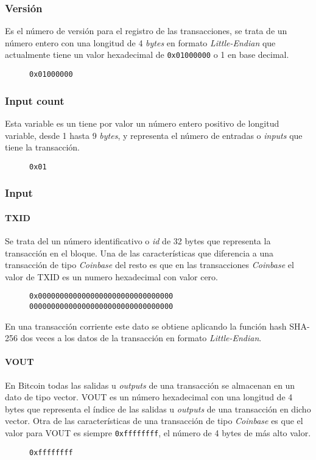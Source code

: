 \documentclass{article}
\begin{document}
    \subsubsection{Versión}
    Es el número de versión para el registro de las transacciones, se trata de un número entero con una longitud de 4 \textit{bytes} en formato \textit{Little-Endian} que actualmente tiene un valor hexadecimal de \texttt{0x01000000} o 1 en base decimal.
    \begin{figure}[H]
        \texttt{0x01000000}
    \end{figure}
    
    \subsubsection{Input count}
    Esta variable es un tiene por valor un número entero positivo de longitud variable, desde 1 hasta 9 \textit{bytes}, y representa el número de entradas o \textit{inputs} que tiene la transacción.
    \begin{figure}[H]
        \texttt{0x01}
    \end{figure}
    
    \subsubsection{Input}
    
    \paragraph{TXID}
    Se trata del un número identificativo o \textit{id} de 32 bytes que representa la transacción en el bloque. Una de las características que diferencia a una transacción de tipo \textit{Coinbase} del resto es que en las transacciones \textit{Coinbase} el valor de TXID es un numero hexadecimal con valor cero.
    \begin{figure}[H]
        \texttt{0x0000000000000000000000000000000} \\
        \texttt{000000000000000000000000000000000}
    \end{figure}
    En una transacción corriente este dato se obtiene aplicando la función hash SHA-256 dos veces a los datos de la transacción en formato \textit{Little-Endian}.
    
    \paragraph{VOUT}
    En Bitcoin todas las salidas u \textit{outputs} de una transacción se almacenan en un dato de tipo vector. VOUT es un número hexadecimal con una longitud de 4 bytes que representa el índice de las salidas u \textit{outputs} de una transacción en dicho vector. Otra de las características de una transacción de tipo \textit{Coinbase} es que el valor para VOUT es siempre \texttt{0xffffffff}, el número de 4 bytes de más alto valor.
    \begin{figure}[H]
        \texttt{0xffffffff}
    \end{figure}
    
\end{document}
